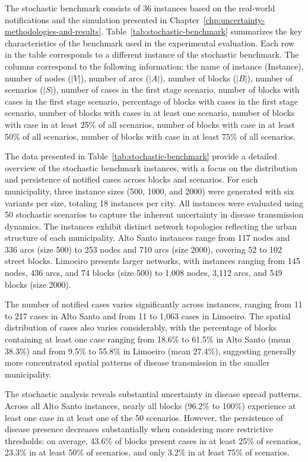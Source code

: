 The stochastic benchmark consists of 36 instances based on the real-world notifications and the simulation presented in Chapter~\ref{chp:uncertainty-methodologies-and-results}. Table~\ref{tab:stochastic-benchmark} summarizes the key characteristics of the benchmark used in the experimental evaluation. Each row in the table corresponds to a different instance of the stochastic benchmark. The columns correspond to the following information: the name of instance (Instance), number of nodes ($|V|$), number of arcs ($|A|$), number of blocks ($|B|$), number of scenarios ($|S|$), number of cases in the first stage scenario, number of blocks with cases in the first stage scenario, percentage of blocks with cases in the first stage scenario, number of blocks with cases in at least one scenario, number of blocks with case in at least 25\% of all scenarios, number of blocks with case in at least 50\% of all scenarios, number of blocks with case in at least 75\% of all scenarios.

The data presented in Table~\ref{tab:stochastic-benchmark} provide a detailed overview of the stochastic benchmark instances, with a focus on the distribution and persistence of notified cases across blocks and scenarios. For each municipality, three instance sizes (500, 1000, and 2000) were generated with six variants per size, totaling 18 instances per city. All instances were evaluated using 50 stochastic scenarios to capture the inherent uncertainty in disease transmission dynamics. The instances exhibit distinct network topologies reflecting the urban structure of each municipality. Alto Santo instances range from 117 nodes and 336 arcs (size 500) to 253 nodes and 710 arcs (size 2000), covering 52 to 102 street blocks. Limoeiro presents larger networks, with instances ranging from 145 nodes, 436 arcs, and 74 blocks (size 500) to 1,008 nodes, 3,112 arcs, and 549 blocks (size 2000). 

The number of notified cases varies significantly across instances, ranging from 11 to 217 cases in Alto Santo and from 11 to 1,063 cases in Limoeiro. The spatial distribution of cases also varies considerably, with the percentage of blocks containing at least one case ranging from 18.6\% to 61.5\% in Alto Santo (mean 38.3\%) and from 9.5\% to 55.8\% in Limoeiro (mean 27.4\%), suggesting generally more concentrated spatial patterns of disease transmission in the smaller municipality.

The stochastic analysis reveals substantial uncertainty in disease spread patterns. Across all Alto Santo instances, nearly all blocks (96.2\% to 100\%) experience at least one case in at least one of the 50 scenarios. However, the persistence of disease presence decreases substantially when considering more restrictive thresholds: on average, 43.6\% of blocks present cases in at least 25\% of scenarios, 23.3\% in at least 50\% of scenarios, and only 3.2\% in at least 75\% of scenarios. 


